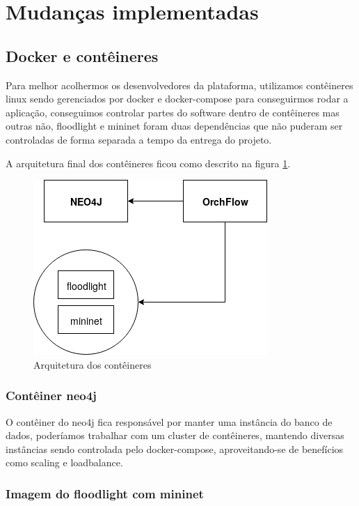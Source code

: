 \documentclass[
	article,			%
	11pt,				%
	oneside,			%
	a4paper,			%
	english,			%
	brazil,				%
	sumario=tradicional
	]{abntex2}
\begin{document}
\section{Mudanças implementadas}

\subsection{Docker e contêineres}

Para melhor acolhermos os desenvolvedores da plataforma, utilizamos contêineres linux sendo gerenciados por docker e docker-compose para conseguirmos rodar a aplicação, conseguimos controlar partes do software dentro de contêineres mas outras não, floodlight e mininet foram duas dependências que não puderam ser controladas de forma separada a tempo da entrega do projeto.

A arquitetura final dos contêineres ficou como descrito na figura \ref{figure_arquitetura_container}.

\begin{figure}[H]
    \label{figure_arquitetura_container}
    \centering
    \caption{Arquitetura dos contêineres}
    \includegraphics[scale=0.8]{arquitetura_container.png}
    \hfill
\end{figure}

\subsubsection{Contêiner neo4j}

O contêiner do neo4j fica responsável por manter uma instância do banco de dados, poderíamos trabalhar com um cluster de contêineres, mantendo diversas instâncias sendo controlada pelo docker-compose, aproveitando-se de benefícios como scaling e loadbalance.

\subsubsection{Imagem do floodlight com mininet}
\end{document}
